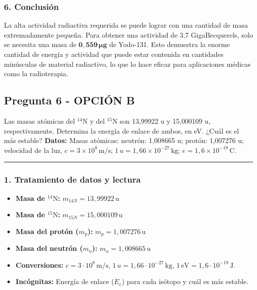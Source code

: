\subsubsection*{6. Conclusión}
\begin{cajaconclusion}
La alta actividad radiactiva requerida se puede lograr con una cantidad de masa extremadamente pequeña. Para obtener una actividad de 3,7 GigaBecquerels, solo se necesita una masa de $\mathbf{0,559 \, \mu g}$ de Yodo-131. Esto demuestra la enorme cantidad de energía y actividad que puede estar contenida en cantidades minúsculas de material radiactivo, lo que lo hace eficaz para aplicaciones médicas como la radioterapia.
\end{cajaconclusion}

\newpage

\subsection{Pregunta 6 - OPCIÓN B}
\label{subsec:6B_2002_sep_ext}

\begin{cajaenunciado}
Las masas atómicas del ${}^{14}\text{N}$ y del ${}^{15}\text{N}$ son 13,99922 u y 15,000109 u, respectivamente. Determina la energía de enlace de ambos, en eV. ¿Cuál es el más estable?
\textbf{Datos:} Masas atómicas: neutrón: 1,008665 u; protón: 1,007276 u; velocidad de la luz, $c=3\times10^8\,\text{m/s}$; $1\,u=1,66\times10^{-27}\,\text{kg}$; $e=1,6\times10^{-19}\,\text{C}$.
\end{cajaenunciado}
\hrule

\subsubsection*{1. Tratamiento de datos y lectura}
\begin{itemize}
    \item \textbf{Masa de ${}^{14}\text{N}$:} $m_{14N} = 13,99922 \, \text{u}$
    \item \textbf{Masa de ${}^{15}\text{N}$:} $m_{15N} = 15,000109 \, \text{u}$
    \item \textbf{Masa del protón ($m_p$):} $m_p = 1,007276 \, \text{u}$
    \item \textbf{Masa del neutrón ($m_n$):} $m_n = 1,008665 \, \text{u}$
    \item \textbf{Conversiones:} $c=3\cdot10^8\,\text{m/s}$, $1\,u=1,66\cdot10^{-27}\,\text{kg}$, $1\,\text{eV} = 1,6\cdot10^{-19}\,\text{J}$.
    \item \textbf{Incógnitas:} Energía de enlace ($E_e$) para cada isótopo y cuál es más estable.
\end{itemize}

